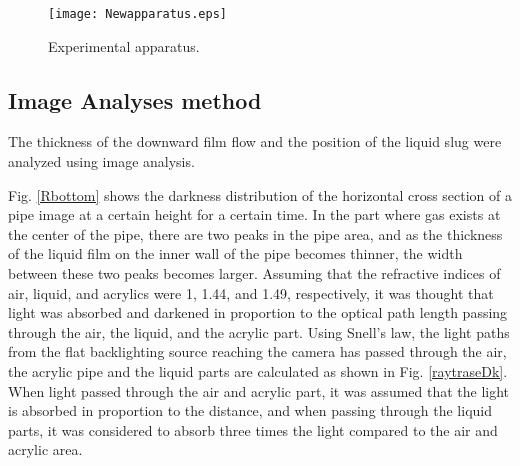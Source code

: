 \documentclass[aps,pre,preprint,groupedaddress,showkeys]{revtex4-2}
\begin{document}
\begin{figure}
\texttt{[image: Newapparatus.eps]}%
\caption{\label{Apparatus} Experimental apparatus.}
\end{figure}

\subsection{Image Analyses method}\label{ime}
The thickness of the downward film flow and the position of the liquid slug were analyzed using image analysis.

Fig. \ref{Rbottom} shows the darkness distribution of the horizontal cross section of a pipe image at a certain height for a certain time.
In the part where gas exists at the center of the pipe, there are two peaks in the pipe area, and as the thickness of the liquid film on the inner wall of the pipe becomes thinner, the width between these two peaks becomes larger.
Assuming that the refractive indices of air, liquid, and acrylics were 1, 1.44, and 1.49, respectively, it was thought that light was absorbed and darkened in proportion to the optical path length passing through the air, the liquid, and the acrylic part.
Using Snell's law, the light paths from the flat backlighting source reaching the camera has passed through the air, the acrylic pipe and the liquid parts are calculated as shown in Fig. \ref{raytraseDk}.
When light passed through the air and acrylic part, it was assumed that the light is absorbed in proportion to the distance, and when passing through the liquid parts, it was considered to absorb three times the light compared to the air and acrylic area.
\end{document}
